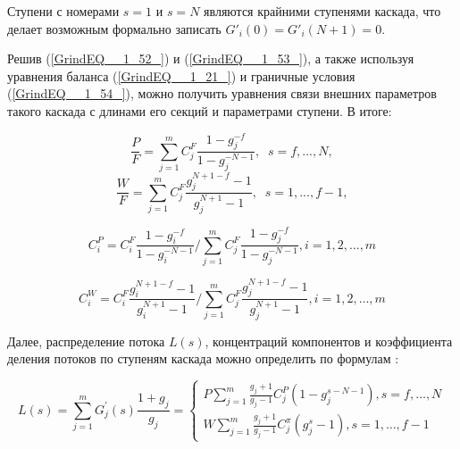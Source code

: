 Ступени с номерами $s=1$ и $s=N$ являются крайними ступенями каскада, что делает возможным формально записать $G'_{i} (0)=G'_{i} (N+1)=0$.

Решив (\ref{GrindEQ__1_52_}) и (\ref{GrindEQ__1_53_}), а также используя уравнения баланса (\ref{GrindEQ__1_21_}) и граничные условия (\ref{GrindEQ__1_54_}), можно получить уравнения связи внешних параметров такого каскада с длинами его секций и параметрами ступени. В итоге:

\begin{equation} \label{GrindEQ__1_55_} 
  \frac{P}{F} =\sum _{j=1}^{m}C_{j}^{F} \frac{1-g_{j}^{-f} }{1-g_{j}^{-N-1}} ,\; \; s=f,...,N ,                                                  
  \end{equation} 
  \begin{equation} \label{GrindEQ__1_56_} 
  \frac{W}{F} =\sum _{j=1}^{m}C_{j}^{F} \frac{g_{j}^{N+1-f} -1}{g_{j}^{N+1} -1} ,\; \; s=1,...,f-1 ,                                            
\end{equation}

\begin{equation} \label{GrindEQ__1_57_} 
  C_{i}^{P}=C_{i}^{F} \frac{1-g_{i}^{-f}}{1-g_{i}^{-N-1}} / \sum_{j=1}^{m} C_{j}^{F} \frac{1-g_{j}^{-f}}{1-g_{j}^{-N-1}}, i=1,2, \ldots, m                             
\end{equation}

\begin{equation} \label{GrindEQ__1_58_} 
  C_{i}^{W}=C_{i}^{F} \frac{g_{i}^{N+1-f}-1}{g_{i}^{N+1}-1} / \sum_{j=1}^{m} C_{j}^{F} \frac{g_{j}^{N+1-f}-1}{g_{j}^{N+1}-1}, i=1,2, \ldots, m                         
\end{equation} 

Далее, распределение потока $L(s)$, концентраций компонентов и коэффициента деления потоков по ступеням каскада можно определить по формулам \cite{sulaberidzeTeoriyaKaskadovDlya2011}:

\begin{equation} \label{GrindEQ__1_59_} 
L(s)=\sum_{j=1}^{m} G_{j}^{\prime}(s) \frac{1+g_{j}}{g_{j}}=\left\{\begin{array}{c}
  P \sum_{j=1}^{m} \frac{g_{j}+1}{g_{j}-1} C_{j}^{P}\left(1-g_{j}^{s-N-1}\right), s=f, \ldots, N \\
  W \sum_{j=1}^{m} \frac{g_{j}+1}{g_{j}-1} C_{j}^{\pi}\left(g_{j}^{s}-1\right), s=1, \ldots, f-1
  \end{array}\right.
\end{equation} 

